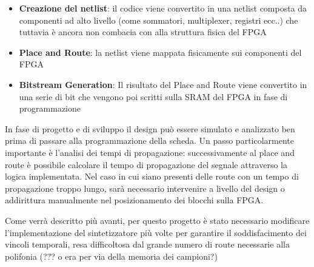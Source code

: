 \begin{itemize}
    \item \textbf{Creazione del netlist}: il codice viene convertito in una
          netlist composta da componenti ad alto livello (come sommatori,
          multiplexer, registri ecc..) che tuttavia è ancora non combacia
          con alla struttura fisica del FPGA
    \item \textbf{Place and Route}: la netlist viene mappata fisicamente sui
          componenti del FPGA
    \item \textbf{Bitstream Generation}: Il risultato del Place and Route viene
          convertito in una serie di bit che vengono poi scritti sulla SRAM
          del FPGA in fase di programmazione
\end{itemize}

In fase di progetto e di sviluppo il design può essere simulato e analizzato
ben prima di passare alla programmazione della scheda.
Un passo particolarmente importante è l'analisi dei tempi di propagazione:
successivamente al place and route è possibile calcolare il tempo di propagazione
del segnale attraverso la logica implementata. Nel caso in cui siano presenti
delle route con un tempo di propagazione troppo lungo, sarà necessario
intervenire a livello del design o addirittura manualmente nel posizionamento
dei blocchi sulla FPGA.

Come verrà descritto più avanti, per questo progetto è stato necessario
modificare l'implementazione del sintetizzatore più volte per garantire il
soddisfacimento dei vincoli temporali, resa difficoltosa dal grande numero
di route necessarie alla polifonia (??? o era per via della memoria dei campioni?)
